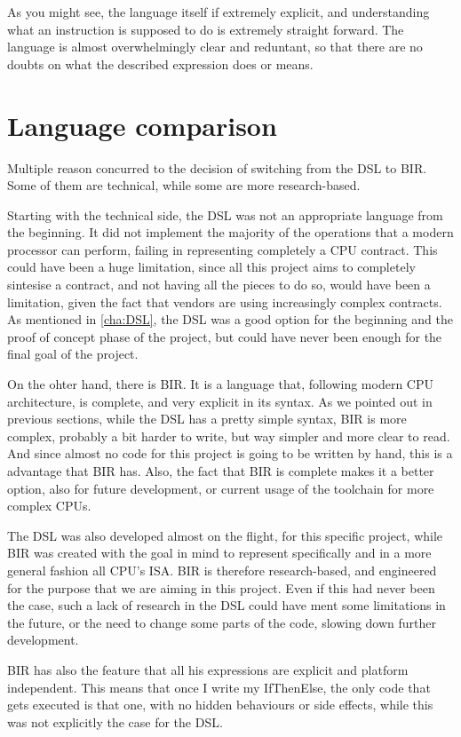 As you might see, the language itself if extremely explicit, and understanding what
an instruction is supposed to do is extremely straight forward. The language is
almost overwhelmingly clear and reduntant, so that there are no doubts on what the
described expression does or means.

\section{Language comparison}
\label{cha:Language comparison} Multiple reason concurred to the decision of switching
from the DSL to BIR. Some of them are technical, while some are more research-based.

Starting with the technical side, the DSL was not an appropriate language from
the beginning. It did not implement the majority of the operations that a modern
processor can perform, failing in representing completely a CPU contract. This could
have been a huge limitation, since all this project aims to completely sintesise
a contract, and not having all the pieces to do so, would have been a limitation,
given the fact that vendors are using increasingly complex contracts. As
mentioned in \ref{cha:DSL}, the DSL was a good option for the beginning and the proof
of concept phase of the project, but could have never been enough for the final
goal of the project.

On the ohter hand, there is BIR. It is a language that, following modern CPU architecture,
is complete, and very explicit in its syntax. As we pointed out in previous
sections, while the DSL has a pretty simple syntax, BIR is more complex, probably
a bit harder to write, but way simpler and more clear to read. And since almost no
code for this project is going to be written by hand, this is a advantage that
BIR has. Also, the fact that BIR is complete makes it a better option, also for future
development, or current usage of the toolchain for more complex CPUs.

The DSL was also developed almost on the flight, for this specific project,
while BIR was created with the goal in mind to represent specifically and in a
more general fashion all CPU's ISA. BIR is therefore research-based, and
engineered for the purpose that we are aiming in this project. Even if this had never
been the case, such a lack of research in the DSL could have ment some
limitations in the future, or the need to change some parts of the code, slowing
down further development.

BIR has also the feature that all his expressions are explicit and platform
independent. This means that once I write my IfThenElse, the only code that gets
executed is that one, with no hidden behaviours or side effects, while this was
not explicitly the case for the DSL.

